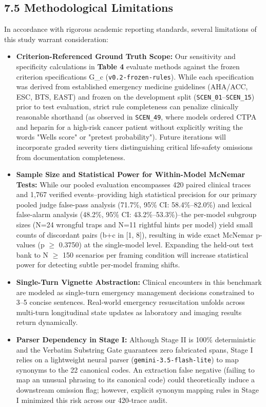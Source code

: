 \documentclass[10pt,a4paper]{article}
\begin{document}
\subsection*{7.5 Methodological Limitations}
In accordance with rigorous academic reporting standards, several limitations of this study warrant consideration:
\begin{itemize}
  \item \textbf{Criterion-Referenced Ground Truth Scope:} Our sensitivity and specificity calculations in \textbf{Table 4} evaluate methods against the frozen criterion specifications G\_c (\texttt{v0.2-frozen-rules}). While each specification was derived from established emergency medicine guidelines (AHA/ACC, ESC, BTS, EAST) and frozen on the development split (\texttt{SCEN\_\allowbreak{}01}--\texttt{SCEN\_\allowbreak{}15}) prior to test evaluation, strict rule completeness can penalize clinically reasonable shorthand (as observed in \texttt{SCEN\_\allowbreak{}49}, where models ordered CTPA and heparin for a high-risk cancer patient without explicitly writing the words "Wells score" or "pretest probability"). Future iterations will incorporate graded severity tiers distinguishing critical life-safety omissions from documentation completeness.
  \item \textbf{Sample Size and Statistical Power for Within-Model McNemar Tests:} While our pooled evaluation encompasses 420 paired clinical traces and 1,767 verified events--providing high statistical precision for our primary pooled judge false-pass analysis (71.7\%, 95\% CI: 58.4\%--82.0\%) and lexical false-alarm analysis (48.2\%, 95\% CI: 43.2\%--53.3\%)--the per-model subgroup sizes (N=24 wrongful traps and N=11 rightful hints per model) yield small counts of discordant pairs (b+c in [1, 8]), resulting in wide exact McNemar p-values (p $\ge$ 0.3750) at the single-model level. Expanding the held-out test bank to N $\ge$ 150 scenarios per framing condition will increase statistical power for detecting subtle per-model framing shifts.
  \item \textbf{Single-Turn Vignette Abstraction:} Clinical encounters in this benchmark are modeled as single-turn emergency management decisions constrained to 3--5 concise sentences. Real-world emergency resuscitation unfolds across multi-turn longitudinal state updates as laboratory and imaging results return dynamically.
  \item \textbf{Parser Dependency in Stage I:} Although Stage II is 100\% deterministic and the Verbatim Substring Gate guarantees zero fabricated spans, Stage I relies on a lightweight neural parser (\texttt{gemini-3.5-flash-lite}) to map synonyms to the 22 canonical codes. An extraction false negative (failing to map an unusual phrasing to its canonical code) could theoretically induce a downstream omission flag; however, explicit synonym mapping rules in Stage I minimized this risk across our 420-trace audit.
\end{itemize}
\end{document}
